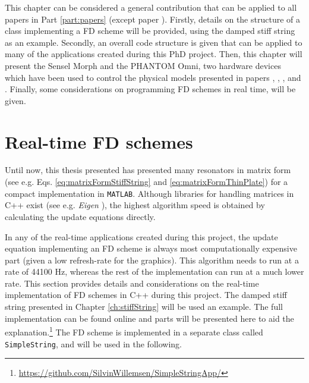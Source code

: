 This chapter can be considered a general contribution that can be applied to all papers in Part \ref{part:papers} (except paper \citeP[G]). Firstly, details on the structure of a class implementing a FD scheme will be provided, using the damped stiff string as an example. Secondly, an overall code structure is given that can be applied to many of the applications created during this PhD project. Then, this chapter will present the Sensel Morph and the PHANTOM Omni, two hardware devices which have been used to control the physical models presented in papers \citeP[A], \citeP[B], \citeP[C], \citeP[D] and \citeP[E]. Finally, some considerations on programming FD schemes in real time, will be given.





\section{Real-time FD schemes}\label{sec:realTimeFDScheme}
Until now, this thesis presented has presented many resonators in matrix form (see e.g. Eqs. \eqref{eq:matrixFormStiffString} and \eqref{eq:matrixFormThinPlate}) for a compact implementation in \texttt{MATLAB}. Although libraries for handling matrices in C++ exist (see e.g. \textit{Eigen} \cite{Eigen}), the highest algorithm speed is obtained by calculating the update equations directly.

In any of the real-time applications created during this project, the update equation implementing an FD scheme is always most computationally expensive part (given a low refresh-rate for the graphics). This algorithm needs to run at a rate of 44100 Hz, whereas the rest of the implementation can run at a much lower rate. This section provides details and considerations on the real-time implementation of FD schemes in C++ during this project. The damped stiff string presented in Chapter \ref{ch:stiffString} will be used an example. The full implementation can be found online and parts will be presented here to aid the explanation.\footnote{\url{https://github.com/SilvinWillemsen/SimpleStringApp/}} The FD scheme is implemented in a separate class called \texttt{SimpleString}, and will be used in the following.


